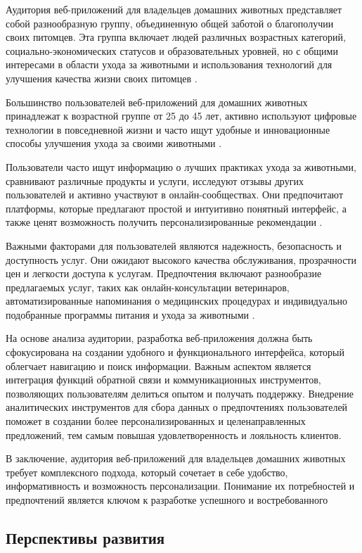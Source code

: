 Аудитория веб-приложений для владельцев домашних животных представляет собой разнообразную группу, объединенную общей заботой о благополучии своих питомцев. Эта группа включает людей различных возрастных категорий, социально-экономических статусов и образовательных уровней, но с общими интересами в области ухода за животными и использования технологий для улучшения качества жизни своих питомцев \cite{market}.

Большинство пользователей веб-приложений для домашних животных принадлежат к возрастной группе от 25 до 45 лет, активно используют цифровые технологии в повседневной жизни и часто ищут удобные и инновационные способы улучшения ухода за своими животными \cite{freedman}.

Пользователи часто ищут информацию о лучших практиках ухода за животными, сравнивают различные продукты и услуги, исследуют отзывы других пользователей и активно участвуют в онлайн-сообществах. Они предпочитают платформы, которые предлагают простой и интуитивно понятный интерфейс, а также ценят возможность получить персонализированные рекомендации \cite{market}.

Важными факторами для пользователей являются надежность, безопасность и доступность услуг. Они ожидают высокого качества обслуживания, прозрачности цен и легкости доступа к услугам. Предпочтения включают разнообразие предлагаемых услуг, таких как онлайн-консультации ветеринаров, автоматизированные напоминания о медицинских процедурах и индивидуально подобранные программы питания и ухода за животными \cite{freedman}.

На основе анализа аудитории, разработка веб-приложения должна быть сфокусирована на создании удобного и функционального интерфейса, который облегчает навигацию и поиск информации. Важным аспектом является интеграция функций обратной связи и коммуникационных инструментов, позволяющих пользователям делиться опытом и получать поддержку. Внедрение аналитических инструментов для сбора данных о предпочтениях пользователей поможет в создании более персонализированных и целенаправленных предложений, тем самым повышая удовлетворенность и лояльность клиентов.

В заключение, аудитория веб-приложений для владельцев домашних животных требует комплексного подхода, который сочетает в себе удобство, информативность и возможность персонализации. Понимание их потребностей и предпочтений является ключом к разработке успешного и востребованного

\subsection{Перспективы развития}

